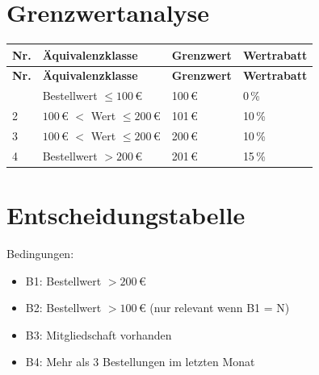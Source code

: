 \documentclass[
	fontsize=12pt,          %
	paper=a4,               %
	numbers=noenddot,       %
	listof=totoc,           %
	listof=entryprefix,     %
	listof=nochaptergap,    %
	bibliography=totoc,     %
	parskip=half,           %
	openany                 %
]{scrbook}
\begin{document}
\section*{Grenzwertanalyse}

\begin{longtable}{| p{0.5cm} | p{4.0cm} | p{4.5cm} | p{3.0cm} |}
	\hline
	\textbf{Nr.} & \textbf{Äquivalenzklasse} & \textbf{Grenzwert} & \textbf{Wertrabatt} \\ \hline
	\endfirsthead
	\hline
	\textbf{Nr.} & \textbf{Äquivalenzklasse} & \textbf{Grenzwert} & \textbf{Wertrabatt} \\ \hline
	\endhead
	\hline
	\endfoot
	1 & Bestellwert $\leq 100$\,€ & 100\,€ & 0\,\% \\ \hline
	2 & $100$\,€ $<$ Wert $\leq 200$\,€ & 101\,€ & 10\,\% \\ \hline
	3 & $100$\,€ $<$ Wert $\leq 200$\,€ & 200\,€ & 10\,\% \\ \hline
	4 & Bestellwert $> 200$\,€ & 201\,€ & 15\,\% \\ \hline
\end{longtable}

\section*{Entscheidungstabelle}

Bedingungen:
\begin{itemize}
	\item B1: Bestellwert $> 200$\,€
	\item B2: Bestellwert $> 100$\,€ (nur relevant wenn B1 = N)
	\item B3: Mitgliedschaft vorhanden
	\item B4: Mehr als 3 Bestellungen im letzten Monat
\end{itemize}
\end{document}
